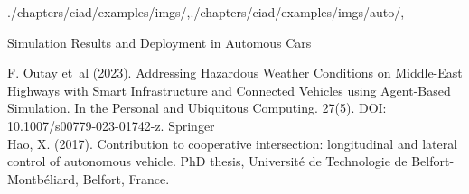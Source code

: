 \begin{graphicspathcontext}{{./chapters/ciad/examples/imgs/},{./chapters/ciad/examples/imgs/auto/},\old}

\begin{frame}[fragile]{{Simulation Results} and Deployment in Automous Cars}
	\vspace{1cm}
	\begin{center}
		\tiny F. Outay et~al (2023). Addressing Hazardous Weather Conditions on Middle-East Highways with Smart Infrastructure and Connected Vehicles using Agent-Based Simulation. In the Personal and Ubiquitous Computing. 27(5). DOI: 10.1007/s00779-023-01742-z. Springer \\
		\tiny Hao, X. (2017). Contribution to cooperative intersection: longitudinal and lateral control of autonomous vehicle. PhD thesis, Université de Technologie de Belfort-Montbéliard, Belfort, France.
	\end{center}
\end{frame}

\end{graphicspathcontext}

\endinput
